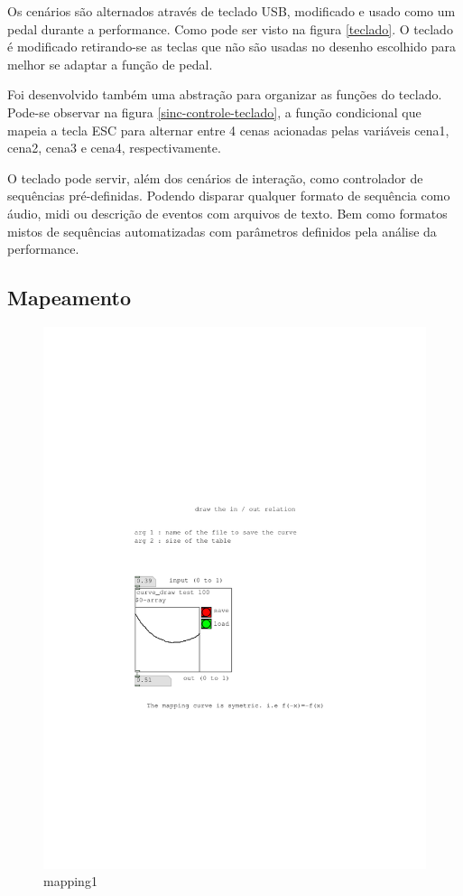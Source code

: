 \documentclass{ppgmus}
\begin{document}
Os cenários são alternados através de teclado USB, modificado e usado como
um pedal durante a performance. Como pode ser visto na figura \ref{teclado}.
O teclado é modificado retirando-se as teclas que não são usadas no desenho escolhido
para melhor se adaptar a função de pedal.

Foi desenvolvido também uma abstração para organizar as funções do teclado.
Pode-se observar na figura \ref{sinc-controle-teclado}, a função condicional
que mapeia a tecla ESC para alternar entre 4 cenas acionadas pelas variáveis
cena1, cena2, cena3 e cena4, respectivamente.

O teclado pode servir, além dos cenários de interação, como controlador
de sequências pré-definidas. Podendo disparar qualquer formato de sequência como
áudio, midi ou descrição de eventos com arquivos de texto. Bem como formatos mistos
de sequências automatizadas com parâmetros definidos pela análise da performance.


\subsection{Mapeamento}


\begin{figure}
\includegraphics[scale=.4]{mapping1}
\caption{mapping1}
\label{mapping1}
\end{figure}
\end{document}
